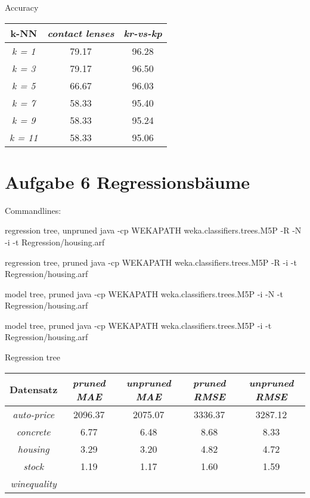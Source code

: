 Accuracy

\begin{tabular}{c|c|c}
                k-NN       & \emph{contact lenses} & \emph{kr-vs-kp}  \\ \hline
				\emph{k = 1} & 79.17  & 96.28  \\ \hline
				\emph{k = 3} & 79.17  & 96.50  \\ \hline
				\emph{k = 5} & 66.67  & 96.03  \\ \hline
				\emph{k = 7} & 58.33  & 95.40  \\ \hline
				\emph{k = 9} & 58.33  & 95.24  \\ \hline
				\emph{k = 11} & 58.33  & 95.06  \\ \hline
\end{tabular}



\section{Aufgabe 6 Regressionsb\"aume}
\label{sec:aufgabe_6_regressionsbaume}


Commandlines: 

regression tree, unpruned
java -cp WEKAPATH weka.classifiers.trees.M5P -R -N -i -t Regression/housing.arf

regression tree, pruned
java -cp WEKAPATH weka.classifiers.trees.M5P -R -i -t Regression/housing.arf

model tree, pruned
java -cp WEKAPATH weka.classifiers.trees.M5P -i -N -t Regression/housing.arf

model tree, pruned
java -cp WEKAPATH weka.classifiers.trees.M5P -i -t Regression/housing.arf

Regression tree

\begin{tabular}{c|c|c|c|c}
                Datensatz  & \emph{pruned MAE } & \emph{unpruned MAE} & \emph{pruned RMSE} & \emph{unpruned RMSE}  \\ \hline
				\emph{auto-price}  & 2096.37 & 2075.07 & 3336.37  & 3287.12 \\ \hline
				\emph{concrete}    & 6.77 & 6.48 &8.68 & 8.33  \\ \hline
				\emph{housing}     & 3.29 & 3.20 & 4.82 & 4.72 \\ \hline
				\emph{stock}       & 1.19 & 1.17 & 1.60 & 1.59 \\ \hline
				\emph{winequality} & & & & 
\end{tabular}










